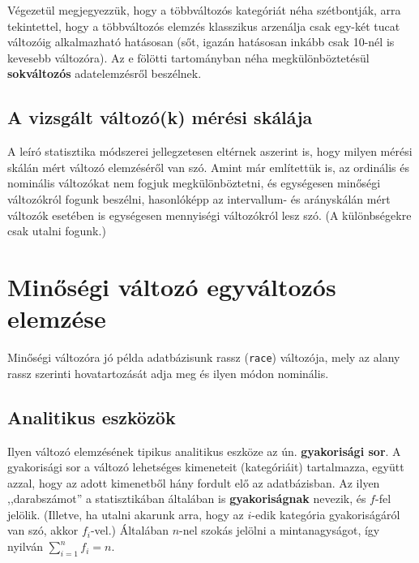 \documentclass[
]{book}
\begin{document}
Végezetül megjegyezzük, hogy a többváltozós kategóriát néha szétbontják, arra tekintettel, hogy a többváltozós elemzés klasszikus arzenálja csak egy-két tucat változóig alkalmazható hatásosan (sőt, igazán hatásosan inkább csak 10-nél is kevesebb változóra). Az e fölötti tartományban néha megkülönböztetésül \textbf{sokváltozós} adatelemzésről beszélnek.

\hypertarget{deskriptivcsoportositasmeresiskala}{%
\subsection{A vizsgált változó(k) mérési skálája}\label{deskriptivcsoportositasmeresiskala}}

A leíró statisztika módszerei jellegzetesen eltérnek aszerint is, hogy milyen mérési skálán mért változó elemzéséről van szó. Amint már említettük is, az ordinális és nominális változókat nem fogjuk megkülönböztetni, és egységesen minőségi változókról fogunk beszélni, hasonlóképp az intervallum- és arányskálán mért változók esetében is egységesen mennyiségi változókról lesz szó. (A különbségekre csak utalni fogunk.)

\hypertarget{deskriptivminegyvalt}{%
\section{Minőségi változó egyváltozós elemzése}\label{deskriptivminegyvalt}}

Minőségi változóra jó példa adatbázisunk rassz (\texttt{race}) változója, mely az alany rassz szerinti hovatartozását adja meg és ilyen módon nominális.

\hypertarget{deskriptivmonegyvaltanalitikus}{%
\subsection{Analitikus eszközök}\label{deskriptivmonegyvaltanalitikus}}

Ilyen változó elemzésének tipikus analitikus eszköze az ún. \textbf{gyakorisági sor}. A gyakorisági sor a változó lehetséges kimeneteit (kategóriáit) tartalmazza, együtt azzal, hogy az adott kimenetből hány fordult elő az adatbázisban. Az ilyen ,,darabszámot'' a statisztikában általában is \textbf{gyakoriságnak} nevezik, és \(f\)-fel jelölik. (Illetve, ha utalni akarunk arra, hogy az \(i\)-edik kategória gyakoriságáról van szó, akkor \(f_i\)-vel.) Általában \(n\)-nel szokás jelölni a mintanagyságot, így nyilván \(\sum_{i=1}^n f_i = n\).
\end{document}
